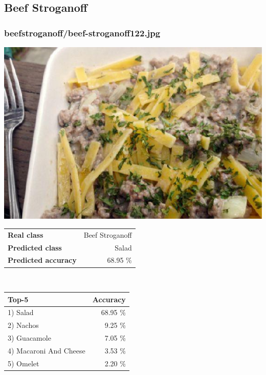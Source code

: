 \subsection{Beef Stroganoff}
    
\subsubsection{beef\textunderscore stroganoff/beef-stroganoff122.jpg}

\begin{minipage}[t]{0.4\textwidth}
	\vspace{0pt}
	\includegraphics[width=\linewidth]{images/evaluation-images/beef_stroganoff/beef-stroganoff122.jpg}
\end{minipage}
\hfill
\begin{minipage}[t]{0.5\textwidth}
	\vspace{0pt}\raggedright
	\begin{tabularx}{\textwidth}{X r}
		\small \textbf{Real class} & \small Beef Stroganoff\\
		\small \textbf{Predicted class} & \small Salad\\
		\small \textbf{Predicted accuracy} & \small 68.95 \%
    \end{tabularx}\\
    
    \vspace{6pt}
	\begin{tabularx}{\textwidth}{X r}
        \small \textbf{Top-5} & \small \textbf{Accuracy} \\
        \hline
		\small 1) Salad & \small 68.95 \%\\\small 2) Nachos & \small 9.25 \%\\\small 3) Guacamole & \small 7.05 \%\\\small 4) Macaroni And Cheese & \small 3.53 \%\\\small 5) Omelet & \small 2.20 \%
    \end{tabularx}
\end{minipage}
    
